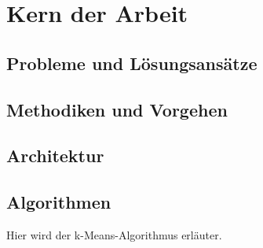 \chapter{Kern der Arbeit}
\section{Probleme und Lösungsansätze}
\section{Methodiken und Vorgehen}
\section{Architektur}
\section{Algorithmen}
Hier wird der k-Means-Algorithmus erläuter.
